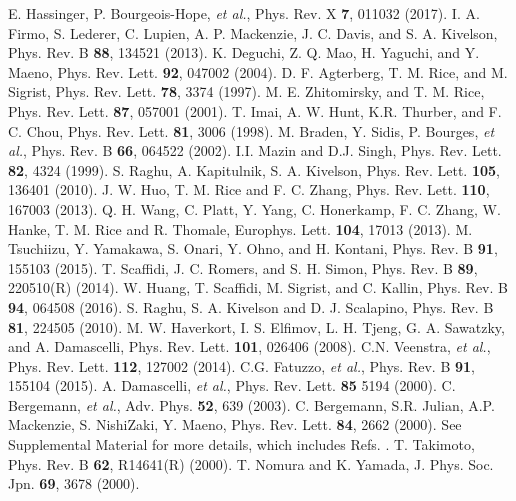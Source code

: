 \documentclass[aps,prl,twocolumn,superscriptaddress,showpacs]{revtex4-1}
\begin{document}
\begin{thebibliography}{99}
 E. Hassinger, P. Bourgeois-Hope, {\it et al.}, Phys. Rev. X {\bf 7}, 011032 (2017).
 I. A. Firmo, S. Lederer, C. Lupien, A. P. Mackenzie, J. C. Davis, and S. A. Kivelson, Phys. Rev. B {\bf 88}, 134521 (2013).
 K. Deguchi, Z. Q. Mao, H. Yaguchi, and Y. Maeno, Phys. Rev. Lett. {\bf 92}, 047002 (2004).
 D. F. Agterberg, T. M. Rice, and M. Sigrist, Phys. Rev. Lett. {\bf 78}, 3374 (1997).
 M. E. Zhitomirsky, and T. M. Rice, Phys. Rev. Lett. {\bf 87}, 057001 (2001).
 T. Imai, A. W. Hunt, K.R. Thurber, and F. C. Chou, Phys. Rev. Lett. {\bf 81}, 3006 (1998).
 M. Braden, Y. Sidis, P. Bourges, {\it et al.},  Phys. Rev. B {\bf 66}, 064522 (2002).
 I.I. Mazin and D.J. Singh, Phys. Rev. Lett. {\bf 82}, 4324 (1999).
 S. Raghu, A. Kapitulnik, S. A. Kivelson, Phys. Rev. Lett. {\bf 105}, 136401 (2010).
 J. W. Huo, T. M. Rice and F. C. Zhang, Phys. Rev. Lett. {\bf 110}, 167003 (2013).
 Q. H. Wang, C. Platt, Y. Yang, C. Honerkamp, F. C. Zhang, W. Hanke, T. M. Rice and R. Thomale, Europhys. Lett. {\bf 104}, 17013 (2013).
  M. Tsuchiizu, Y. Yamakawa, S. Onari, Y. Ohno, and H. Kontani, Phys. Rev. B {\bf 91}, 155103 (2015).
 T. Scaffidi, J. C. Romers, and S. H. Simon, Phys. Rev. B {\bf 89}, 220510(R) (2014).
 W. Huang, T. Scaffidi, M. Sigrist, and C. Kallin, Phys. Rev. B {\bf 94}, 064508 (2016).
 S. Raghu, S. A. Kivelson and D. J. Scalapino, Phys. Rev. B {\bf 81}, 224505 (2010).
 M. W. Haverkort, I. S. Elfimov, L. H. Tjeng, G. A. Sawatzky, and A. Damascelli, Phys. Rev. Lett. {\bf 101}, 026406 (2008).
 C.N. Veenstra, {\it et al.}, Phys. Rev. Lett. {\bf 112}, 127002 (2014).
 C.G. Fatuzzo, {\it et al.}, Phys. Rev. B {\bf 91}, 155104 (2015).
  A. Damascelli, {\it et al.}, Phys. Rev. Lett. {\bf 85} 5194 (2000).
 C. Bergemann, {\it et al.}, Adv. Phys. {\bf 52}, 639 (2003).
 C. Bergemann, S.R. Julian, A.P. Mackenzie, S. NishiZaki, Y. Maeno, Phys. Rev. Lett. {\bf 84}, 2662 (2000).
 See Supplemental Material for more details, which includes Refs. .
 T. Takimoto, Phys. Rev. B {\bf 62}, R14641(R) (2000).
 T. Nomura and K. Yamada, J. Phys. Soc. Jpn. {\bf 69}, 3678 (2000).

\end{thebibliography}
\end{document}

